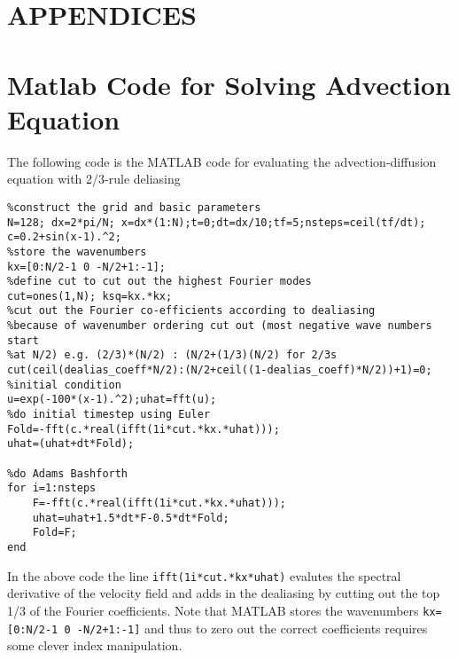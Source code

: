 \documentclass[letterpaper,12pt,titlepage,oneside,final]{book}
\begin{document}
%
%



\appendix

\chapter*{APPENDICES}
\chapter[Spectral Example in Matlab]{Matlab Code for Solving Advection Equation}
\label{AppendixA}

The following code is the MATLAB code for evaluating the advection-diffusion equation with 2/3-rule deliasing

\begin{verbatim}
%construct the grid and basic parameters
N=128; dx=2*pi/N; x=dx*(1:N);t=0;dt=dx/10;tf=5;nsteps=ceil(tf/dt);
c=0.2+sin(x-1).^2;
%store the wavenumbers
kx=[0:N/2-1 0 -N/2+1:-1];
%define cut to cut out the highest Fourier modes
cut=ones(1,N); ksq=kx.*kx;
%cut out the Fourier co-efficients according to dealiasing 
%because of wavenumber ordering cut out (most negative wave numbers start
%at N/2) e.g. (2/3)*(N/2) : (N/2+(1/3)(N/2) for 2/3s
cut(ceil(dealias_coeff*N/2):(N/2+ceil((1-dealias_coeff)*N/2))+1)=0;
%initial condition
u=exp(-100*(x-1).^2);uhat=fft(u);
%do initial timestep using Euler
Fold=-fft(c.*real(ifft(1i*cut.*kx.*uhat)));
uhat=(uhat+dt*Fold); 

%do Adams Bashforth
for i=1:nsteps
    F=-fft(c.*real(ifft(1i*cut.*kx.*uhat)));
    uhat=uhat+1.5*dt*F-0.5*dt*Fold;
    Fold=F;
end
\end{verbatim}
In the above code the line \texttt{ifft(1i*cut.*kx*uhat)} evalutes the spectral derivative of the velocity field and adds in the dealiasing by cutting out the top 1/3 of the Fourier coefficients. Note that MATLAB stores the wavenumbers \texttt{kx=[0:N/2-1 0 -N/2+1:-1]} and thus to zero out the correct coefficients requires some clever index manipulation. 
\end{document}
